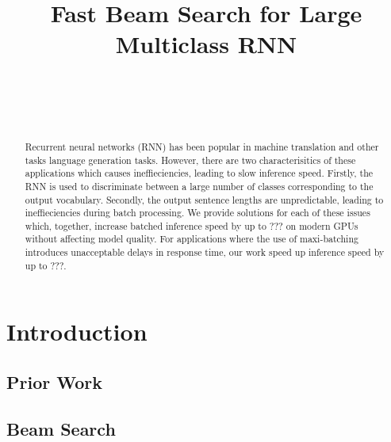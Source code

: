 \documentclass[]{article}
\begin{document}
\title{\bf Fast Beam Search for Large Multiclass RNN}  

\author{ \hfill  {}\\ 
        \addr{}
\AND
        \hfill {}\\
\AND
        \hfill {}\\
}

\maketitle
\pagestyle{empty}

\begin{abstract}

Recurrent neural networks (RNN) has been popular in machine translation and other tasks language generation tasks. However, there are two characterisitics of these applications which causes ineffieciencies, leading to slow inference speed. Firstly, the RNN is used to discriminate between a large number of classes corresponding to the output vocabulary. Secondly, the output sentence lengths are unpredictable, leading to ineffieciencies during batch processing. We provide solutions for each of these issues which, together, increase batched inference speed by up to ??? on modern GPUs without affecting model quality. For applications where the use of maxi-batching introduces unacceptable delays in response time, our work speed up inference speed by up to ???.

\end{abstract}

\section{Introduction}

\subsection{Prior Work}

\subsection{Beam Search}
\end{document}
